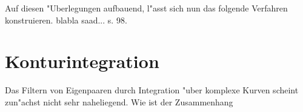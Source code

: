 Auf diesen "Uberlegungen aufbauend, l"asst sich nun das folgende Verfahren konstruieren.
blabla saad... s. 98.


\section{Konturintegration}
Das Filtern von Eigenpaaren durch Integration "uber komplexe Kurven scheint
zun"achst nicht sehr naheliegend. Wie ist der Zusammenhang
